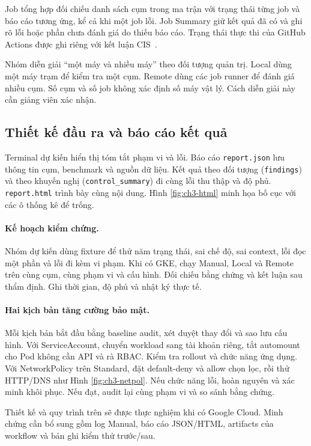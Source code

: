 Job tổng hợp đối chiếu danh sách cụm trong ma trận với trạng thái từng job và báo cáo tương ứng, kể cả khi một job lỗi. Job Summary giữ kết quả đã có và ghi rõ lỗi hoặc phần chưa đánh giá do thiếu báo cáo. Trạng thái thực thi của GitHub Actions được ghi riêng với kết luận CIS~\mbox{\parencite{github-workflow-jobs}}.

Nhóm diễn giải “một máy và nhiều máy” theo đối tượng quản trị. Local dùng một máy trạm để kiểm tra một cụm. Remote dùng các job runner để đánh giá nhiều cụm. Số cụm và số job không xác định số máy vật lý. Cách diễn giải này cần giảng viên xác nhận.

\subsection{Thiết kế đầu ra và báo cáo kết quả}

Terminal dự kiến hiển thị tóm tắt phạm vi và lỗi. Báo cáo \texttt{report.json} lưu thông tin cụm, benchmark và nguồn dữ liệu. Kết quả theo đối tượng (\texttt{findings}) và theo khuyến nghị (\texttt{control\_summary}) đi cùng lỗi thu thập và độ phủ. \texttt{report.html} trình bày cùng nội dung. Hình \ref{fig:ch3-html} minh họa bố cục với các ô thống kê để trống.


{\small{}}

\paragraph{Kế hoạch kiểm chứng.}
Nhóm dự kiến dùng fixture để thử năm trạng thái, sai chế độ, sai context, lỗi đọc một phần và lỗi đi kèm vi phạm. Khi có GKE, chạy Manual, Local và Remote trên cùng cụm, cùng phạm vi và cấu hình. Đối chiếu bằng chứng và kết luận sau thẩm định. Ghi thời gian, độ phủ và nhật ký thực tế.

\paragraph{Hai kịch bản tăng cường bảo mật.}
Mỗi kịch bản bắt đầu bằng baseline audit, xét duyệt thay đổi và sao lưu cấu hình. Với ServiceAccount, chuyển workload sang tài khoản riêng, tắt automount cho Pod không cần API và rà RBAC. Kiểm tra rollout và chức năng ứng dụng. Với NetworkPolicy trên Standard, đặt default-deny và allow chọn lọc, rồi thử HTTP/DNS như Hình \ref{fig:ch3-netpol}. Nếu chức năng lỗi, hoàn nguyên và xác minh khôi phục. Nếu đạt, audit lại cùng phạm vi và so sánh bằng chứng.

Thiết kế và quy trình trên sẽ được thực nghiệm khi có Google Cloud. Minh chứng cần bổ sung gồm log Manual, báo cáo JSON/HTML, artifacts của workflow và bản ghi kiểm thử trước/sau.
\par\endgroup

